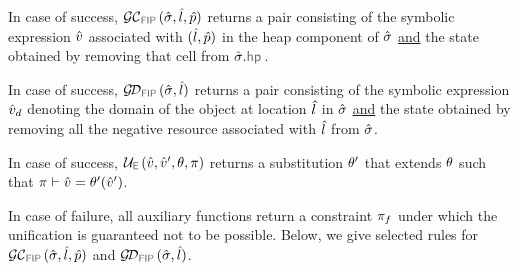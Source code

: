 \begin{description}
\setlength{\itemsep}{0.2em}
  \item[FIP GetCell.] In case of success, $\GetCellV{\sstate, \sloc, \sexprp}$ returns 
          a pair consisting of the symbolic expression $\hat{v}$ associated with 
          $(\hat{l}, \hat{p})$ in the heap component of $\hat{\sigma}$ \underline{and} 
          the state obtained by removing that cell from $\sstate.\hpsel$.
  
  \item[FIP GetDomain.] In case of success, $\GetDomainV{\sstate, \sloc}$ returns 
          a pair consisting of the symbolic expression $\hat{v}_d$ denoting the domain 
          of the object at location $\hat{l}$ in $\hat{\sigma}$ \underline{and} 
          the state obtained by removing all the negative resource associated with 
          $\hat{l}$ from $\hat{\sigma}$.  
  
  \item[Expression Unification.]  In case of success, $\unifylexpr(\sexprv, \sexprv', \subst, \pc)$ 
          returns a substitution $\theta'$ that extends $\theta$ such that $\pi \vdash \hat{v} = \theta'(\hat{v}')$. 
\end{description}
In case of failure, all auxiliary functions return a constraint $\pi_f$ under which 
the unification is guaranteed not to be possible. 
Below, we give selected rules for $\GetCellV{\sstate, \sloc, \sexprp}$ and $\GetDomainV{\sstate, \sloc}$.  

